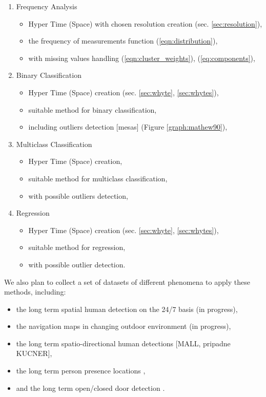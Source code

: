 \begin{enumerate}
    \item Frequency Analysis
    \begin{itemize}
        \item Hyper Time (Space) with chosen resolution creation (sec. \ref{sec:resolution}),
        \item the frequency of measurements function (\ref{eqn:distribution}),
        \item with missing values handling (\ref{eqn:cluster_weights}), (\ref{eq:components}),
    \end{itemize}
    \item Binary Classification
    \begin{itemize}
        \item Hyper Time (Space) creation (sec. \ref{sec:whyte}, \ref{sec:whytes}),
        \item suitable method for binary classification,
        \item including outliers detection [mesas] (Figure \ref{graph:mathew90}),
    \end{itemize}
    \item Multiclass Classification
    \begin{itemize}
        \item Hyper Time (Space) creation,
        \item suitable method for multiclass classification,
        \item with possible outliers detection,
    \end{itemize}
    \item Regression
    \begin{itemize}
        \item Hyper Time (Space) creation (sec. \ref{sec:whyte}, \ref{sec:whytes}),
        \item suitable method for regression,
        \item with possible outlier detection.
    \end{itemize}
\end{enumerate}

We also plan to collect a set of datasets of different phenomena to apply these methods, including:
\begin{itemize}
    \item the long term spatial human detection on the 24/7 basis (in progress),
    \item the navigation maps in changing outdoor environment (in progress),
    \item the long term spatio-directional human detections [MALL, pripadne KUCNER],
    \item the long term person presence locations \cite{krajnik2015s},
    \item and the long term open/closed door detection \cite{krajnik2014long}.
\end{itemize} 
    
        

